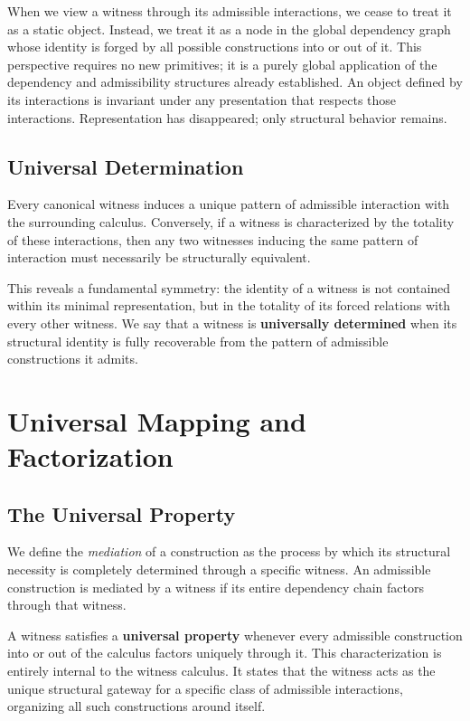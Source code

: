 \documentclass[12pt,anyside]{book}
\begin{document}
When we view a witness through its admissible interactions, we cease to treat it as a static object. Instead, we treat it as a node in the global dependency graph whose identity is forged by all possible constructions into or out of it. This perspective requires no new primitives; it is a purely global application of the dependency and admissibility structures already established. An object defined by its interactions is invariant under any presentation that respects those interactions. Representation has disappeared; only structural behavior remains.

\subsection{Universal Determination}
Every canonical witness induces a unique pattern of admissible interaction with the surrounding calculus. Conversely, if a witness is characterized by the totality of these interactions, then any two witnesses inducing the same pattern of interaction must necessarily be structurally equivalent.

This reveals a fundamental symmetry: the identity of a witness is not contained within its minimal representation, but in the totality of its forced relations with every other witness. We say that a witness is \textbf{universally determined} when its structural identity is fully recoverable from the pattern of admissible constructions it admits.

\section{Universal Mapping and Factorization}

\subsection{The Universal Property}
We define the \textit{mediation} of a construction as the process by which its structural necessity is completely determined through a specific witness. An admissible construction is mediated by a witness if its entire dependency chain factors through that witness.

A witness satisfies a \textbf{universal property} whenever every admissible construction into or out of the calculus factors uniquely through it. This characterization is entirely internal to the witness calculus. It states that the witness acts as the unique structural gateway for a specific class of admissible interactions, organizing all such constructions around itself.
\end{document}
